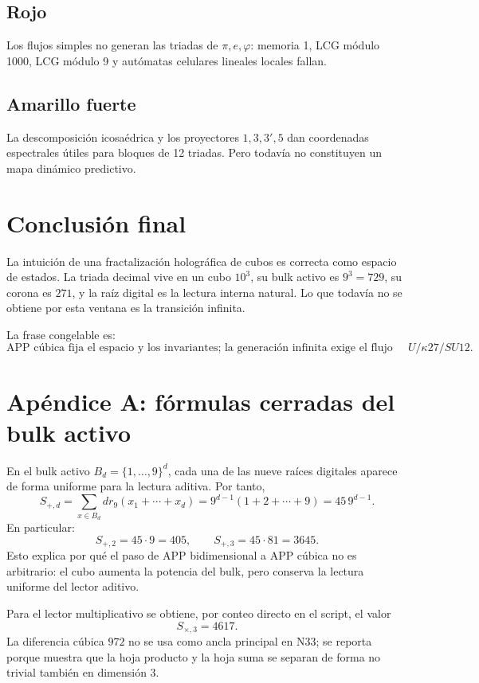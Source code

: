 \documentclass[11pt,a4paper]{article}
\begin{document}
\subsection*{Rojo}
Los flujos simples no generan las triadas de \(\pi,e,\varphi\): memoria 1, LCG módulo 1000, LCG módulo 9 y autómatas celulares lineales locales fallan.

\subsection*{Amarillo fuerte}
La descomposición icosaédrica y los proyectores \(1,3,3',5\) dan coordenadas espectrales útiles para bloques de 12 triadas. Pero todavía no constituyen un mapa dinámico predictivo.

\section*{Conclusión final}
La intuición de una fractalización holográfica de cubos es correcta como espacio de estados. La triada decimal vive en un cubo \(10^3\), su bulk activo es \(9^3=729\), su corona es \(271\), y la raíz digital es la lectura interna natural. Lo que todavía no se obtiene por esta ventana es la transición infinita.

La frase congelable es:
\[
\boxed{\text{APP cúbica fija el espacio y los invariantes; la generación infinita exige el flujo HMT sobre clases }U/\kappa27/SU12.}
\]



\appendix
\section{Apéndice A: fórmulas cerradas del bulk activo}
En el bulk activo \(B_d=\{1,\ldots,9\}^d\), cada una de las nueve raíces digitales aparece de forma uniforme para la lectura aditiva. Por tanto,
\[
S_{+,d}=\sum_{x\in B_d}dr_9(x_1+\cdots+x_d)
=9^{d-1}(1+2+\cdots+9)=45\,9^{d-1}.
\]
En particular:
\[
S_{+,2}=45\cdot9=405,
\qquad
S_{+,3}=45\cdot81=3645.
\]
Esto explica por qué el paso de APP bidimensional a APP cúbica no es arbitrario: el cubo aumenta la potencia del bulk, pero conserva la lectura uniforme del lector aditivo.

Para el lector multiplicativo se obtiene, por conteo directo en el script, el valor
\[
S_{\times,3}=4617.
\]
La diferencia cúbica \(972\) no se usa como ancla principal en N33; se reporta porque muestra que la hoja producto y la hoja suma se separan de forma no trivial también en dimensión 3.
\end{document}
